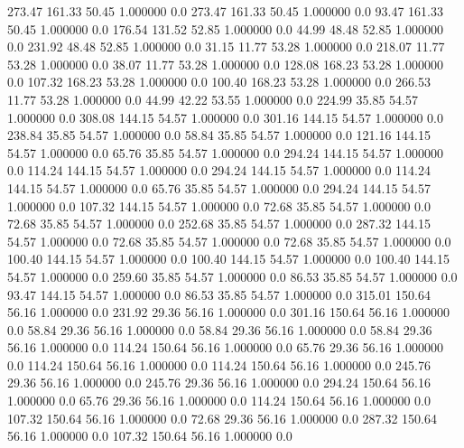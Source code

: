   273.47  161.33   50.45    1.000000    0.0
  273.47  161.33   50.45    1.000000    0.0
   93.47  161.33   50.45    1.000000    0.0
  176.54  131.52   52.85    1.000000    0.0
   44.99   48.48   52.85    1.000000    0.0
  231.92   48.48   52.85    1.000000    0.0
   31.15   11.77   53.28    1.000000    0.0
  218.07   11.77   53.28    1.000000    0.0
   38.07   11.77   53.28    1.000000    0.0
  128.08  168.23   53.28    1.000000    0.0
  107.32  168.23   53.28    1.000000    0.0
  100.40  168.23   53.28    1.000000    0.0
  266.53   11.77   53.28    1.000000    0.0
   44.99   42.22   53.55    1.000000    0.0
  224.99   35.85   54.57    1.000000    0.0
  308.08  144.15   54.57    1.000000    0.0
  301.16  144.15   54.57    1.000000    0.0
  238.84   35.85   54.57    1.000000    0.0
   58.84   35.85   54.57    1.000000    0.0
  121.16  144.15   54.57    1.000000    0.0
   65.76   35.85   54.57    1.000000    0.0
  294.24  144.15   54.57    1.000000    0.0
  114.24  144.15   54.57    1.000000    0.0
  294.24  144.15   54.57    1.000000    0.0
  114.24  144.15   54.57    1.000000    0.0
   65.76   35.85   54.57    1.000000    0.0
  294.24  144.15   54.57    1.000000    0.0
  107.32  144.15   54.57    1.000000    0.0
   72.68   35.85   54.57    1.000000    0.0
   72.68   35.85   54.57    1.000000    0.0
  252.68   35.85   54.57    1.000000    0.0
  287.32  144.15   54.57    1.000000    0.0
   72.68   35.85   54.57    1.000000    0.0
   72.68   35.85   54.57    1.000000    0.0
  100.40  144.15   54.57    1.000000    0.0
  100.40  144.15   54.57    1.000000    0.0
  100.40  144.15   54.57    1.000000    0.0
  259.60   35.85   54.57    1.000000    0.0
   86.53   35.85   54.57    1.000000    0.0
   93.47  144.15   54.57    1.000000    0.0
   86.53   35.85   54.57    1.000000    0.0
  315.01  150.64   56.16    1.000000    0.0
  231.92   29.36   56.16    1.000000    0.0
  301.16  150.64   56.16    1.000000    0.0
   58.84   29.36   56.16    1.000000    0.0
   58.84   29.36   56.16    1.000000    0.0
   58.84   29.36   56.16    1.000000    0.0
  114.24  150.64   56.16    1.000000    0.0
   65.76   29.36   56.16    1.000000    0.0
  114.24  150.64   56.16    1.000000    0.0
  114.24  150.64   56.16    1.000000    0.0
  245.76   29.36   56.16    1.000000    0.0
  245.76   29.36   56.16    1.000000    0.0
  294.24  150.64   56.16    1.000000    0.0
   65.76   29.36   56.16    1.000000    0.0
  114.24  150.64   56.16    1.000000    0.0
  107.32  150.64   56.16    1.000000    0.0
   72.68   29.36   56.16    1.000000    0.0
  287.32  150.64   56.16    1.000000    0.0
  107.32  150.64   56.16    1.000000    0.0
